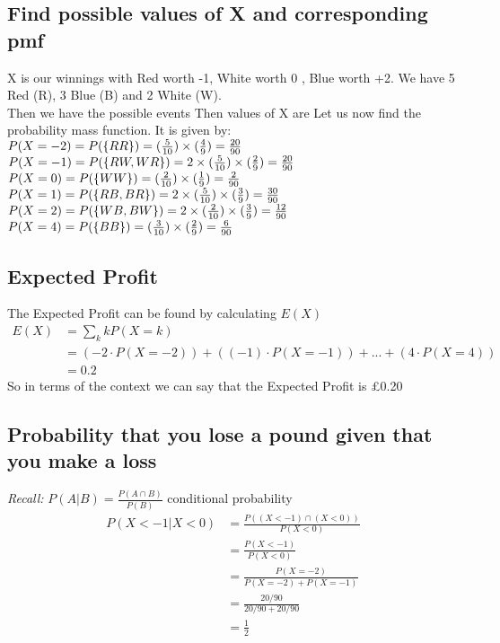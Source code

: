 \documentclass[10pt]{article}
\begin{document}
\subsection{Find possible values of X and corresponding pmf}
X is our winnings with Red worth -1, White worth 0 , Blue worth +2.
We have 5 Red (R), 3 Blue (B) and 2 White (W). \\
Then we have the possible events
Then values of X are  
Let us now find the probability mass function. It is given by: \\
$
    P(X=-2)= P(\{RR\}) = (\frac{5}{10}) \times (\frac{4}{9}) = \frac{20}{90} \\
$
\\
$
    P(X=-1)= P(\{RW, WR\}) = 2\times(\frac{5}{10}) \times (\frac{2}{9}) = \frac{20}{90} \\
$
\\
$
    P(X=0) = P(\{WW\}) = (\frac{2}{10}) \times (\frac{1}{9}) = \frac{2}{90} \\
$
\\
$
   P(X=1) = P(\{RB,BR\})= 2\times(\frac{5}{10}) \times (\frac{3}{9}) = \frac{30}{90} \\
$
\\
$
   P(X=2) = P(\{WB,BW\})= 2\times(\frac{2}{10}) \times (\frac{3}{9}) = \frac{12}{90} \\
$
\\
$
    P(X=4) = P(\{BB\})= (\frac{3}{10}) \times (\frac{2}{9}) = \frac{6}{90} \\
$

\subsection{Expected Profit}
The Expected Profit can be found by calculating $E(X)$
\begin{align*}
    E(X) &= \sum_{k} kP(X=k) \\
         &= (-2 \cdot P(X=-2)) + ((-1) \cdot P(X= -1)) + ...+ (4 \cdot P(X=4)) \\
         &= 0.2
\end{align*}
So in terms of the context we can say that the Expected Profit is \pounds 0.20

\subsection{Probability that you lose a pound given that you make a loss}
\emph{Recall:} $ P(A|B) = \frac{P(A \cap B)}{P(B)}$ conditional probability \\
\begin{align*}
    P(X < -1 | X < 0) &= \frac{P((X < -1) \cap (X < 0))} {P(X<0)} \\
                      &= \frac{P(X < -1)}{P(X < 0)}\\
                      &= \frac{P(X = -2)}{P(X=-2) + P(X=-1)}\\
                      &= \frac{20/90}{20/90 + 20/90} \\
                      &= \frac{1}{2}
\end{align*}
\end{document}
